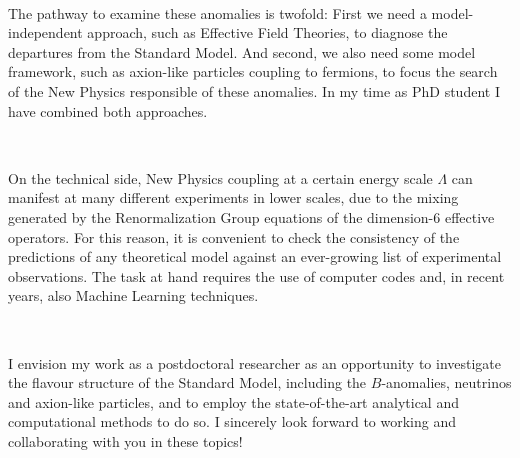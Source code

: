 \documentclass[12pt, a4paper]{article}
\begin{document}
{}~

The pathway to examine these anomalies is twofold: First we need a model-independent approach, such as Effective Field Theories, to diagnose the departures from the Standard Model. And second, we also need some model framework, such as axion-like particles coupling to fermions, to focus the search of the New Physics responsible of these anomalies. In my time as PhD student I have combined both approaches.

{}~

On the technical side, New Physics coupling at a certain energy scale $\Lambda$ can manifest at many different experiments in lower scales, due to the mixing generated by the Renormalization Group equations of the dimension-6 effective operators. For this reason, it is convenient to check the consistency of the predictions of any theoretical model against an ever-growing list of experimental observations. The task at hand requires the use of computer codes and, in recent years, also Machine Learning techniques.

{}~

I envision my work as a postdoctoral researcher as an opportunity to investigate the flavour structure of the Standard Model, including the $B$-anomalies, neutrinos and axion-like particles, and to employ the state-of-the-art analytical and computational methods to do so. I sincerely look forward to working and collaborating with you in these topics!
\end{document}
